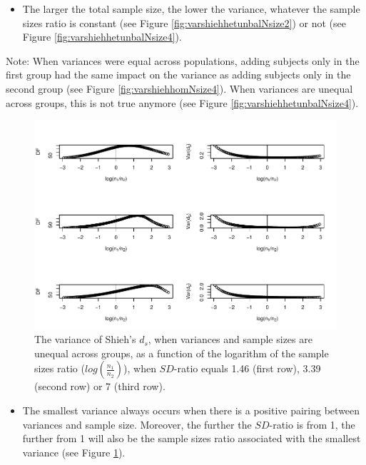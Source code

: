 \documentclass[
  english,
  man]{apa6}
\providecommand{\tightlist}{%
  \setlength{\itemsep}{0pt}\setlength{\parskip}{0pt}}
\begin{document}
\begin{itemize}
\tightlist
\item
  The larger the total sample size, the lower the variance, whatever the sample sizes ratio is constant (see Figure \ref{fig:varshiehhetunbalNsize2}) or not (see Figure \ref{fig:varshiehhetunbalNsize4}).
\end{itemize}

Note: When variances were equal across populations, adding subjects only in the first group had the same impact on the variance as adding subjects only in the second group (see Figure \ref{fig:varshiehhomNsize4}). When variances are unequal across groups, this is not true anymore (see Figure \ref{fig:varshiehhetunbalNsize4}).

\begin{figure}
\centering
\includegraphics{Theoretical-Variance-of-all-estimators-as-a-function-of-population-parameters_files/figure-latex/varshiehhetunbaldfandvar-1.pdf}
\caption{\label{fig:varshiehhetunbaldfandvar}The variance of Shieh's \(d_s\), when variances and sample sizes are unequal across groups, as a function of the logarithm of the sample sizes ratio (\(log \left( \frac{n_1}{n_2} \right)\)), when \(SD\)-ratio equals 1.46 (first row), 3.39 (second row) or 7 (third row).}
\end{figure}

\begin{itemize}
\tightlist
\item
  The smallest variance always occurs when there is a positive pairing between variances and sample size. Moreover, the further the \(SD\)-ratio is from 1, the further from 1 will also be the sample sizes ratio associated with the smallest variance (see Figure \ref{fig:varshiehhetunbaldfandvar}).
\end{itemize}
\end{document}
